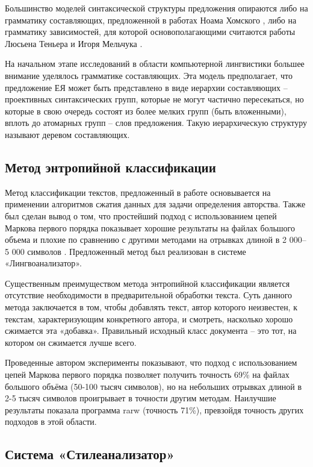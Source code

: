 Большинство моделей синтаксической структуры предложения  опираются либо на грамматику составляющих, предложенной в работах Ноама Хомского \cite{chomsky}, либо на грамматику зависимостей, для которой основополагающими считаются работы Люсьена Теньера \cite{tesniere} и Игоря Мельчука \cite{melcuk}.

На начальном этапе исследований в области компьютерной лингвистики большее внимание уделялось грамматике составляющих. Эта модель предполагает, что предложение ЕЯ может быть представлено в виде иерархии составляющих – проективных синтаксических групп, которые не могут частично пересекаться, но которые в свою очередь состоят из более мелких групп (быть вложенными), вплоть до атомарных групп – слов предложения. Такую иерархическую структуру называют деревом составляющих.

\subsection{Метод энтропийной классификации}

Метод классификации текстов, предложенный в работе \cite{entropy1} основывается на применении алгоритмов сжатия данных для задачи определения авторства. Также был сделан вывод о том, что простейший подход с использованием цепей Маркова первого порядка показывает хорошие результаты на файлах большого объема и плохие по сравнению с другими методами на отрывках длиной в 2 000–5 000 символов \cite{batura}. Предложенный метод был реализован в системе «Лингвоанализатор».

Существенным преимуществом метода энтропийной классификации является отсутствие необходимости в предварительной обработки текста. Суть данного метода заключается в том, чтобы добавлять текст, автор которого неизвестен, к текстам, характеризующим конкретного автора, и смотреть, насколько хорошо сжимается эта «добавка». Правильный исходный класс документа – это тот, на котором он сжимается лучше всего.

Проведенные автором эксперименты показывают, что подход с использованием цепей Маркова первого порядка позволяет получить точность 69\%  на файлах большого объёма (50-100 тысяч символов), но на небольших отрывках длиной в 2-5 тысяч символов проигрывает в точности другим методам. Наилучшие результаты показала программа rarw (точность 71\%), превзойдя точность других подходов в этой области.

\subsection{Система «Стилеанализатор»}

